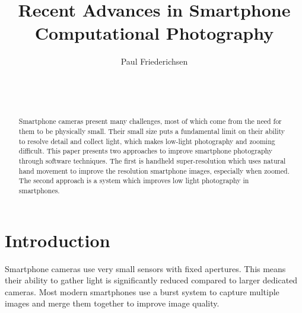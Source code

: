 \documentclass{sig-alternate}
\begin{document}

\title{Recent Advances in Smartphone Computational Photography}


\author{
\alignauthor
Paul Friederichsen\\
	\\
	\\
	\\
}

\maketitle

\begin{abstract}

Smartphone cameras present many challenges, most of which come from the need for them to be physically small. Their small size puts a fundamental limit on their ability to resolve detail and collect light, which makes low-light photography and zooming difficult. This paper presents two approaches to improve smartphone photography through software techniques. The first is handheld super-resolution which uses natural hand movement to improve the resolution smartphone images, especially when zoomed. The second approach is a system which improves low light photography in smartphones.

\end{abstract}


\section{Introduction}

Smartphone cameras use very small sensors with fixed apertures. This means their ability to gather light is significantly reduced compared to larger dedicated cameras. Most modern smartphones use a burst system to capture multiple images and merge them together to improve image quality.
\end{document}
